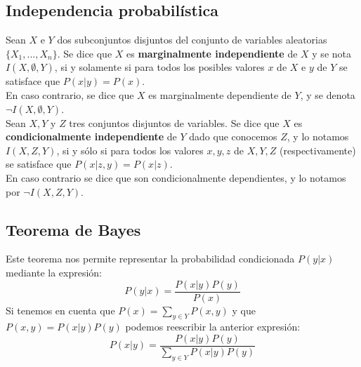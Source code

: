 \documentclass{article}
\begin{document}
\subsection{Independencia probabilística}
Sean $X$ e $Y$ dos subconjuntos disjuntos del conjunto de variables aleatorias $\{X_1,...,X_n\}$. Se dice que $X$ es \textbf{marginalmente independiente} de $X$ y se nota $I(X,\emptyset,Y)$, si y solamente si para todos los posibles valores $x$ de $X$ e $y$ de $Y$ se satisface que $P(x|y)=P(x)$.\\
En caso contrario, se dice que $X$ es marginalmente dependiente de $Y$, y se denota $\neg I(X,\emptyset,Y)$.\\

Sean $X, Y$ y $Z$ tres conjuntos disjuntos de variables. Se dice que $X$ es \textbf{condicionalmente independiente} de $Y$ dado que conocemos $Z$, y lo notamos $I(X,Z,Y)$, si y sólo si para todos los valores $x,y,z$ de $X,Y,Z$ (respectivamente) se satisface que $P(x|z,y)=P(x|z)$.\\
En caso contrario se dice que son condicionalmente dependientes, y lo notamos por $\neg I(X,Z,Y)$.

\subsection{Teorema de Bayes}
Este teorema nos permite representar la probabilidad condicionada $P(y|x)$ mediante la expresión:
\[	P(y|x)=\frac{P(x|y)P(y)}{P(x)}	\]
Si tenemos en cuenta que $P(x) = \sum_{y \in Y}P(x,y)$ y que $P(x,y) = P(x|y)P(y)$ podemos reescribir la anterior expresión:
\[	P(x|y) = \frac{P(x|y)P(y)}{\sum_{y \in Y} P(x|y)P(y)}	\]
\end{document}
